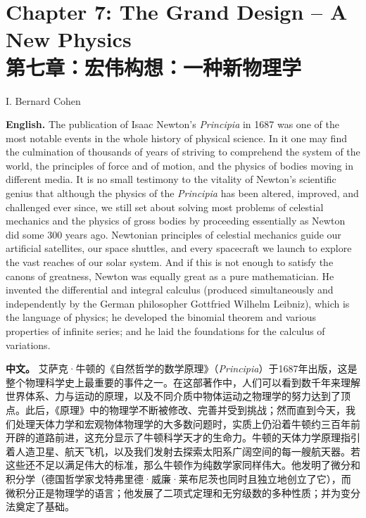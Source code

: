 
\section*{Chapter 7: The Grand Design -- A New Physics\\第七章：宏伟构想：一种新物理学}
\begin{flushright}
I. Bernard Cohen
\end{flushright}

\noindent\textbf{English.} The publication of Isaac Newton's \emph{Principia} in 1687 was one of the most notable events in the whole history of physical science. In it one may find the culmination of thousands of years of striving to comprehend the system of the world, the principles of force and of motion, and the physics of bodies moving in different media. It is no small testimony to the vitality of Newton's scientific genius that although the physics of the \emph{Principia} has been altered, improved, and challenged ever since, we still set about solving most problems of celestial mechanics and the physics of gross bodies by proceeding essentially as Newton did some 300 years ago. Newtonian principles of celestial mechanics guide our artificial satellites, our space shuttles, and every spacecraft we launch to explore the vast reaches of our solar system. And if this is not enough to satisfy the canons of greatness, Newton was equally great as a pure mathematician. He invented the differential and integral calculus (produced simultaneously and independently by the German philosopher Gottfried Wilhelm Leibniz), which is the language of physics; he developed the binomial theorem and various properties of infinite series; and he laid the foundations for the calculus of variations.
\par\noindent\textbf{中文。} 艾萨克·牛顿的《自然哲学的数学原理》（\emph{Principia}）于1687年出版，这是整个物理科学史上最重要的事件之一。在这部著作中，人们可以看到数千年来理解世界体系、力与运动的原理，以及不同介质中物体运动之物理学的努力达到了顶点。此后，《原理》中的物理学不断被修改、完善并受到挑战；然而直到今天，我们处理天体力学和宏观物体物理学的大多数问题时，实质上仍沿着牛顿约三百年前开辟的道路前进，这充分显示了牛顿科学天才的生命力。牛顿的天体力学原理指引着人造卫星、航天飞机，以及我们发射去探索太阳系广阔空间的每一艘航天器。若这些还不足以满足伟大的标准，那么牛顿作为纯数学家同样伟大。他发明了微分和积分学（德国哲学家戈特弗里德·威廉·莱布尼茨也同时且独立地创立了它），而微积分正是物理学的语言；他发展了二项式定理和无穷级数的多种性质；并为变分法奠定了基础。
\medskip

